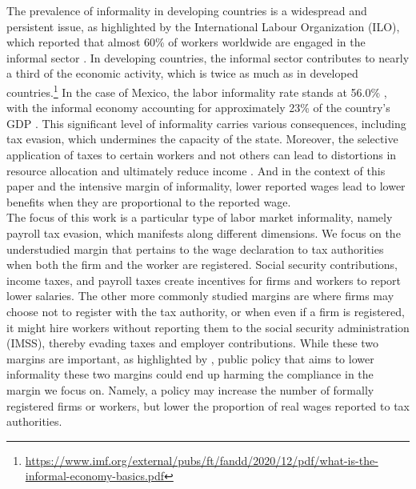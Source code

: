 \documentclass[10pt, oneside]{book}
\begin{document}
The prevalence of informality in developing countries is a widespread and persistent issue, as highlighted by the International Labour Organization (ILO), which reported that almost 60\% of workers worldwide are engaged in the informal sector \citep{ILO_2018}. In developing countries, the informal sector contributes to nearly a third of the economic activity, which is twice as much as in developed countries.\footnote{\url{https://www.imf.org/external/pubs/ft/fandd/2020/12/pdf/what-is-the-informal-economy-basics.pdf}} In the case of Mexico, the labor informality rate stands at 56.0\% \citep{ENOET120}, with the informal economy accounting for approximately 23\% of the country's GDP \citep{INEGI19}. This significant level of informality carries various consequences, including tax evasion, which undermines the capacity of the state. Moreover, the selective application of taxes to certain workers and not others can lead to distortions in resource allocation and ultimately reduce income \citep{Misallocation}. And in the context of this paper and the intensive margin of informality, lower reported wages lead to lower benefits when they are proportional to the reported wage. \\

The focus of this work is a particular type of labor market informality, namely payroll tax evasion, which manifests along different dimensions. We focus on the understudied margin that pertains to the wage declaration to tax authorities when both the firm and the worker are registered. Social security contributions, income taxes, and payroll taxes create incentives for firms and workers to report lower salaries. The other more commonly studied margins are where firms may choose not to register with the tax authority, or when even if a firm is registered, it might hire workers without reporting them to the social security administration (IMSS), thereby evading taxes and employer contributions. While these two margins are important, as highlighted by \cite{Ulyssea}, public policy that aims to lower informality these two margins could end up harming the compliance in the margin we focus on. Namely, a policy may increase the number of formally registered firms or workers, but lower the proportion of real wages reported to tax authorities. \\
\end{document}
